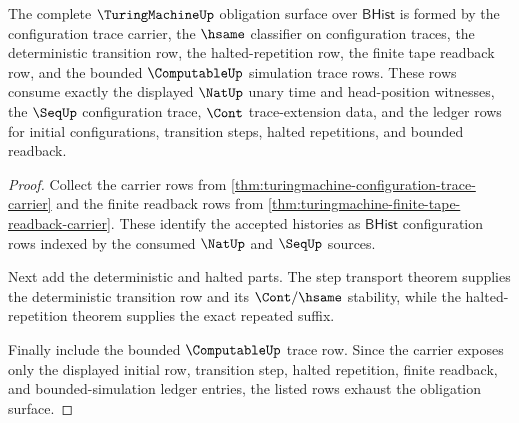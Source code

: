 \begin{theorem}
\label{thm:turingmachine-obligation-surface}
The complete $\TuringMachineUp$ obligation surface over $\mathsf{BHist}$ is
formed by the configuration trace carrier, the $\hsame$ classifier on
configuration traces, the deterministic transition row, the halted-repetition
row, the finite tape readback row, and the bounded $\ComputableUp$ simulation
trace rows. These rows consume exactly the displayed $\NatUp$ unary time and
head-position witnesses, the $\SeqUp$ configuration trace, $\Cont$
trace-extension data, and the ledger rows for initial configurations,
transition steps, halted repetitions, and bounded readback.
\end{theorem}
\begin{proof}
Collect the carrier rows from
\autoref{thm:turingmachine-configuration-trace-carrier} and the finite readback
rows from \autoref{thm:turingmachine-finite-tape-readback-carrier}. These
identify the accepted histories as $\mathsf{BHist}$ configuration rows indexed
by the consumed $\NatUp$ and $\SeqUp$ sources.

Next add the deterministic and halted parts. The step transport theorem
supplies the deterministic transition row and its $\Cont/\hsame$ stability,
while the halted-repetition theorem supplies the exact repeated suffix.

Finally include the bounded $\ComputableUp$ trace row. Since the carrier exposes
only the displayed initial row, transition step, halted repetition, finite
readback, and bounded-simulation ledger entries, the listed rows exhaust the
obligation surface.
\end{proof}

